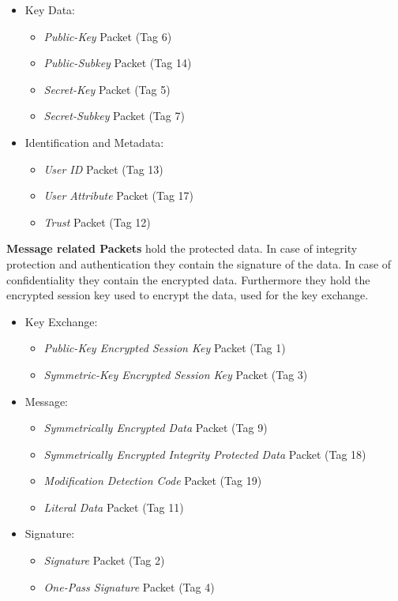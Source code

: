 \begin{itemize}
	\item Key Data:
	\begin{itemize}
		\item \textit{Public-Key} Packet (Tag 6)
		\item \textit{Public-Subkey} Packet (Tag 14)
		\item \textit{Secret-Key} Packet (Tag 5)
		\item \textit{Secret-Subkey} Packet (Tag 7)
	\end{itemize}
	\item Identification and Metadata:
	\begin{itemize}
		\item \textit{User ID} Packet (Tag 13)
		\item \textit{User Attribute} Packet (Tag 17)
		\item \textit{Trust} Packet (Tag 12)
	\end{itemize}
\end{itemize}

\textbf{Message related Packets} hold the protected data. In case of integrity protection and authentication they contain the signature of the data. In case of confidentiality they contain the encrypted data.
Furthermore they hold the encrypted session key used to encrypt the data, used for the key exchange.

\begin{itemize}
	\item Key Exchange:
	\begin{itemize}
		\item \textit{Public-Key Encrypted Session Key} Packet (Tag 1)
		\item \textit{Symmetric-Key Encrypted Session Key} Packet (Tag 3)
	\end{itemize}
	
	\item Message:
	\begin{itemize}
		\item \textit{Symmetrically Encrypted Data} Packet (Tag 9)
		\item \textit{Symmetrically Encrypted Integrity Protected Data} Packet (Tag 18)
		\item \textit{Modification Detection Code} Packet (Tag 19)
		\item \textit{Literal Data} Packet (Tag 11)
	\end{itemize}
	
	\item Signature:
	\begin{itemize}
		\item \textit{Signature} Packet (Tag 2)
		\item \textit{One-Pass Signature} Packet (Tag 4)
	\end{itemize}
\end{itemize}

